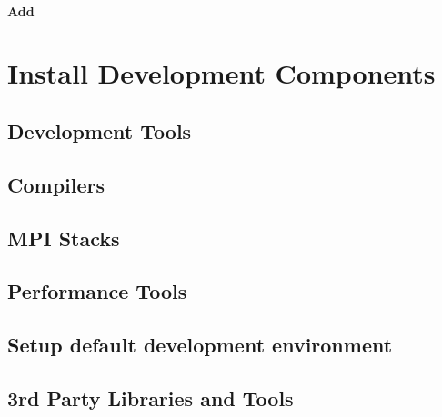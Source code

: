 \documentclass[letterpaper]{article}
\begin{document}
\paragraph{Add \nhc{}} \label{sec:add_nhc}



\section{Install \OHPC{} Development Components}


\subsection{Development Tools} \label{sec:install_dev_tools}


\vspace*{-0.15cm}
\subsection{Compilers} \label{sec:install_compilers}


\subsection{MPI Stacks} \label{sec:mpi}


\subsection{Performance Tools} \label{sec:install_perf_tools}


\subsection{Setup default development environment}


\vspace*{0.3cm}
\subsection{3rd Party Libraries and Tools} \label{sec:3rdparty}



\vspace*{0.1cm}


\vspace*{.6cm}
\end{document}

